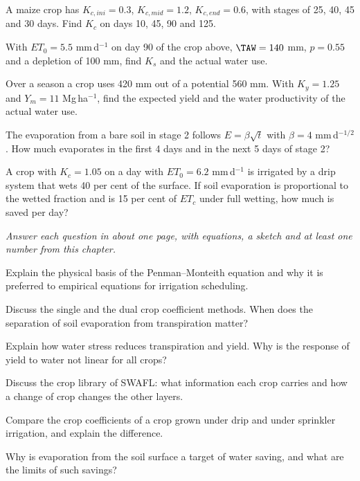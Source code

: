 \begin{exlist}
\item A maize crop has $K_{c,ini}=0.3$, $K_{c,mid}=1.2$, $K_{c,end}=0.6$, with stages of 25, 40, 45 and 30 days. Find $K_c$ on days 10, 45, 90 and 125.
\item With $ET_0=5.5$ mm\,d$^{-1}$ on day 90 of the crop above, $\TAW=140$ mm, $p=0.55$ and a depletion of 100 mm, find $K_s$ and the actual water use.
\item Over a season a crop uses 420 mm out of a potential 560 mm. With $K_y=1.25$ and $Y_m=11$ Mg\,ha$^{-1}$, find the expected yield and the water productivity of the actual water use.
\item The evaporation from a bare soil in stage 2 follows $E=\beta\sqrt t$ with $\beta=4$ mm\,d$^{-1/2}$. How much evaporates in the first 4 days and in the next 5 days of stage 2?\exans{8 mm; 4 mm}
\item A crop with $K_c=1.05$ on a day with $ET_0=6.2$ mm\,d$^{-1}$ is irrigated by a drip system that wets 40 per cent of the surface. If soil evaporation is proportional to the wetted fraction and is 15 per cent of $ET_c$ under full wetting, how much is saved per day?\exans{0.59 mm}
\end{exlist}
{\small\itshape Answer each question in about one page, with equations, a sketch and at least one number from this chapter.}\par\vspace{3pt}
\begin{exlist}
\item Explain the physical basis of the Penman--Monteith equation and why it is preferred to empirical equations for irrigation scheduling.
\item Discuss the single and the dual crop coefficient methods. When does the separation of soil evaporation from transpiration matter?
\item Explain how water stress reduces transpiration and yield. Why is the response of yield to water not linear for all crops?
\item Discuss the crop library of SWAFL: what information each crop carries and how a change of crop changes the other layers.
\item Compare the crop coefficients of a crop grown under drip and under sprinkler irrigation, and explain the difference.
\item Why is evaporation from the soil surface a target of water saving, and what are the limits of such savings?
\end{exlist}
